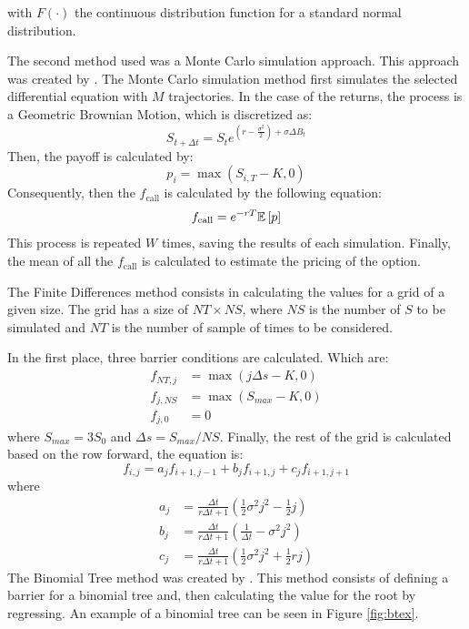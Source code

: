 \documentclass[11pt]{article}
\theoremstyle{definition}
\theoremstyle{remark}
\theoremstyle{remark}
\newcommand{\expp}[1]{e^{#1}}
\begin{document}
with $F(\cdot)$ the continuous distribution function for a standard normal
distribution.

The second method used was a Monte Carlo simulation approach. This approach was
created by \textcite{boyle1977}. The Monte Carlo simulation method first
simulates the selected differential equation with $M$ trajectories. In the case
of the returns, the process is a Geometric Brownian Motion, which is discretized
as:
\begin{equation*}
  S_{t + \Delta t} = S_{t}\expp{\left(r - \frac{\sigma^{2}}{2}\right) + \sigma \Delta B_{t}}
\end{equation*}
Then, the payoff is calculated by:
\begin{equation*}
  p_{i} = \max(S_{i,T} - K, 0)
\end{equation*}
Consequently, then the $f_{\text{call}}$ is calculated by the following
equation:
\begin{equation*}
  f_{\text{call}} = e^{-rT} \E{p}
\end{equation*}
This process is repeated $W$ times, saving the results of each simulation.
Finally, the mean of all the $f_{\text{call}}$ is calculated to estimate the
pricing of the option.

The Finite Differences method consists in calculating the values for a grid of a
given size. The grid has a size of $NT \times NS$, where $NS$ is the number of
$S$ to be simulated and $NT$ is the number of sample of times to be considered.

In the first place, three barrier conditions are calculated. Which are:
\begin{align*}
  f_{NT, j} &= \max(j \Delta s - K, 0) \\
  f_{j, NS} &= \max(S_{max} - K, 0) \\
  f_{j, 0} &= 0
\end{align*}
where $S_{max} = 3S_{0}$ and $\Delta s = S_{max} / NS$. Finally, the rest of the
grid is calculated based on the row forward, the equation is:
\begin{equation*}
  f_{i, j} = a_{j} f_{i+1, j-1} + b_{j} f_{i + 1, j} + c_{j} f_{i+1, j+1}
\end{equation*}
where
\begin{align*}
  a_{j} &= \frac{\Delta t}{r \Delta t + 1} \left(\frac{1}{2}\sigma^{2} j^{2}
          - \frac{1}{2}j\right) \\
  b_{j} &= \frac{\Delta t}{r \Delta t + 1} \left(\frac{1}{\Delta t} - \sigma^{2}
          j^{2}\right) \\
  c_{j} &= \frac{\Delta t}{r \Delta t + 1} \left(\frac{1}{2}\sigma^{2}j^{2} +
          \frac{1}{2}rj\right)
\end{align*}
The Binomial Tree method was created by \textcite{cox1979}. This method consists
of defining a barrier for a binomial tree and, then calculating the value for
the root by regressing. An example of a binomial tree can be seen in Figure
\ref{fig:btex}.
\end{document}
